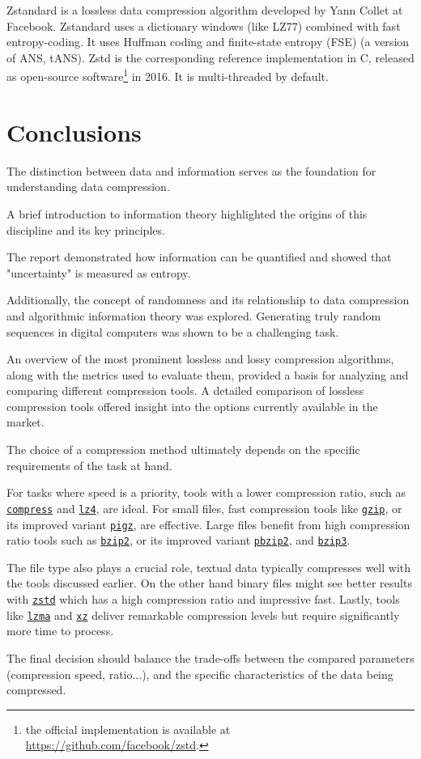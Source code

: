 \documentclass[12pt, a4paper]{report}
\begin{document}
Zstandard is a lossless data compression algorithm developed by Yann Collet at Facebook.
Zstandard uses a dictionary windows (like LZ77) combined with fast entropy-coding.
It uses Huffman coding and finite-state entropy (FSE) (a version of ANS, tANS).
Zstd is the corresponding reference implementation in C, released as open-source software\footnote{the official implementation is
available at \url{https://github.com/facebook/zstd}.} in 2016.
It is multi-threaded by default.

\appendix

\chapter{Conclusions}

The distinction between data and information serves as the foundation for understanding data compression.

A brief introduction to information theory highlighted the origins of this discipline and its key principles.

The report demonstrated how information can be quantified and showed that "uncertainty" is measured as entropy.

Additionally, the concept of randomness and its relationship to data compression and algorithmic information theory was explored.
Generating truly random sequences in digital computers was shown to be a challenging task.

An overview of the most prominent lossless and lossy compression algorithms, along with the metrics used to evaluate them,
provided a basis for analyzing and comparing different compression tools.
A detailed comparison of lossless compression tools offered insight into the options currently available in the market.

The choice of a compression method ultimately depends on the specific requirements of the task at hand.

For tasks where speed is a priority, tools with a lower compression ratio, such as \hyperref[subsec:compress]{\texttt{compress}}
and \hyperref[subsec:lz4]{\texttt{lz4}}, are ideal.
For small files, fast compression tools like \hyperref[subsec:gzip]{\texttt{gzip}}, or its improved variant
\hyperref[subsec:gzip]{\texttt{pigz}}, are effective.
Large files benefit from high compression ratio tools such as \hyperref[subsec:bzip2]{\texttt{bzip2}}, or its improved variant
\hyperref[subsec:bzip2]{\texttt{pbzip2}}, and \hyperref[subsec:bzip3]{\texttt{bzip3}}.

The file type also plays a crucial role, textual data typically compresses well with the tools discussed earlier.
On the other hand binary files might see better results with \hyperref[subsec:zstd]{\texttt{zstd}} which has a high compression
ratio and impressive fast.
Lastly, tools like \hyperref[subsec:lzma]{\texttt{lzma}} and \hyperref[subsec:xz]{\texttt{xz}} deliver remarkable compression
levels but require significantly more time to process.

The final decision should balance the trade-offs between the compared parameters (compression speed, ratio...), and the specific
characteristics of the data being compressed.

\printbibliography
\thispagestyle{empty}
\end{document}

